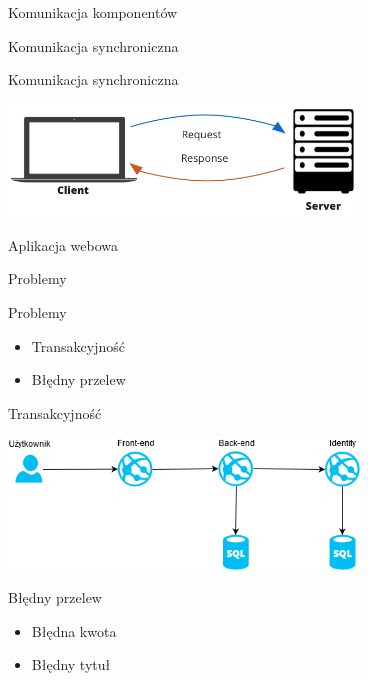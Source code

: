 \documentclass{beamer}
\begin{document}
\begin{frame}{Komunikacja komponentów}
	\begin{center}
		\Huge{Komunikacja synchroniczna}
	\end{center}
\end{frame}

\begin{frame}{Komunikacja synchroniczna}
	\begin{center}
		\includegraphics[height=3cm]{prosta_komunikacja2.png}
	\end{center}
\end{frame}

\begin{frame}{Aplikacja webowa}
	\begin{center}
		\Huge{Problemy}
	\end{center}
\end{frame}

\begin{frame}{Problemy}
	\begin{huge}
		\begin{itemize}[<+->]
			\item Transakcyjność
			\item Błędny przelew
		\end{itemize}
	\end{huge}
\end{frame}

\begin{frame}{Transakcyjność}
	\begin{center}
		\includegraphics[height=3.5cm]{transaction2.png}
	\end{center}
\end{frame}

\begin{frame}{Błędny przelew}
	\begin{huge}
		\begin{itemize}[<+->]
			\item Błędna kwota
			\item Błędny tytuł
		\end{itemize}
	\end{huge}
\end{frame}
\end{document}

